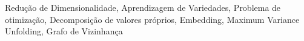 \acresetall
\noindent Redução de Dimensionalidade, Aprendizagem de Variedades, Problema de otimização, Decomposição de valores próprios, Embedding, Maximum Variance Unfolding, Grafo de Vizinhança